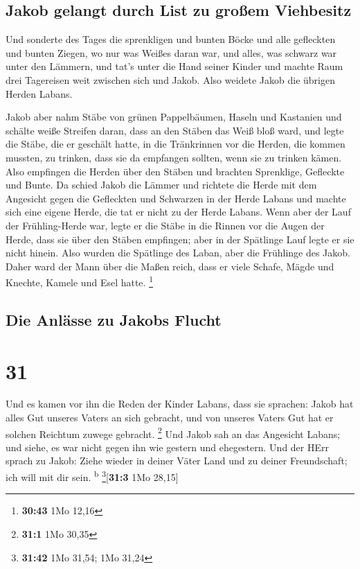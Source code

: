 \hypertarget{jakob-gelangt-durch-list-zu-grouxdfem-viehbesitz}{%
\subsection{Jakob gelangt durch List zu großem
Viehbesitz}\label{jakob-gelangt-durch-list-zu-grouxdfem-viehbesitz}}

 Und sonderte des Tages die sprenkligen und bunten Böcke
und alle gefleckten und bunten Ziegen, wo nur was Weißes daran war, und
alles, was schwarz war unter den Lämmern, und tat's unter die Hand
seiner Kinder  und machte Raum drei Tagereisen weit
zwischen sich und Jakob. Also weidete Jakob die übrigen Herden Labans.

 Jakob aber nahm Stäbe von grünen Pappelbäumen, Haseln
und Kastanien und schälte weiße Streifen daran, dass an den Stäben das
Weiß bloß ward,  und legte die Stäbe, die er geschält
hatte, in die Tränkrinnen vor die Herden, die kommen mussten, zu
trinken, dass sie da empfangen sollten, wenn sie zu trinken kämen.
 Also empfingen die Herden über den Stäben und brachten
Sprenklige, Gefleckte und Bunte.  Da schied Jakob die
Lämmer und richtete die Herde mit dem Angesicht gegen die Gefleckten und
Schwarzen in der Herde Labans und machte sich eine eigene Herde, die tat
er nicht zu der Herde Labans.  Wenn aber der Lauf der
Frühling-Herde war, legte er die Stäbe in die Rinnen vor die Augen der
Herde, dass sie über den Stäben empfingen;  aber in der
Spätlinge Lauf legte er sie nicht hinein. Also wurden die Spätlinge des
Laban, aber die Frühlinge des Jakob.  Daher ward der Mann
über die Maßen reich, dass er viele Schafe, Mägde und Knechte, Kamele
und Esel hatte. \footnote{\textbf{30:43} 1Mo 12,16}

\hypertarget{die-anluxe4sse-zu-jakobs-flucht}{%
\subsection{Die Anlässe zu Jakobs
Flucht}\label{die-anluxe4sse-zu-jakobs-flucht}}

\hypertarget{section-30}{%
\section{31}\label{section-30}}

 Und es kamen vor ihn die Reden der Kinder Labans, dass
sie sprachen: Jakob hat alles Gut unseres Vaters an sich gebracht, und
von unseres Vaters Gut hat er solchen Reichtum zuwege gebracht.
\footnote{\textbf{31:1} 1Mo 30,35}  Und Jakob sah an das
Angesicht Labans; und siehe, es war nicht gegen ihn wie gestern und
ehegestern.  Und der HErr sprach zu Jakob: Ziehe wieder in
deiner Väter Land und zu deiner Freundschaft; ich will mit dir sein.
\textsuperscript{b} \footnote{\textbf{31:42} 1Mo 31,54; 1Mo 31,24}{[}\textbf{31:3}
1Mo 28,15{]}

